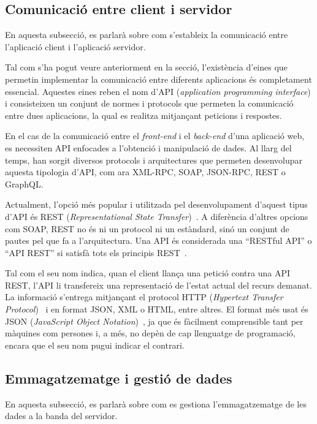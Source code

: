 \documentclass[a4paper,12pt]{ThesisStyle}
\begin{document}
\subsection{Comunicació entre client i servidor}
\label{subsec:comunicacio_cs}

En aquesta subsecció, es parlarà sobre com s'estableix la comunicació entre l'aplicació client i l'aplicació servidor.

Tal com s'ha pogut veure anteriorment en la secció, l'existència d'eines que permetin implementar la comunicació entre diferents aplicacions és completament essencial. Aquestes eines reben el nom d'API (\textit{application programming interface}) i consisteixen un conjunt de normes i protocols que permeten la comunicació entre dues aplicacions, la qual es realitza mitjançant peticions i respostes.

En el cas de la comunicació entre el \textit{front-end} i el \textit{back-end} d'una aplicació web, es necessiten API enfocades a l'obtenció i manipulació de dades. Al llarg del temps, han sorgit diversos protocols i arquitectures que permeten desenvolupar aquesta tipologia d'API, com ara XML-RPC, SOAP, JSON-RPC, REST o GraphQL.

Actualment, l'opció més popular i utilitzada pel desenvolupament d'aquest tipus d'API és REST (\textit{Representational State Transfer})~\cite{REST}. A diferència d'altres opcions com SOAP, REST no és ni un protocol ni un estàndard, sinó un conjunt de pautes pel que fa a l'arquitectura. Una API és considerada una ``RESTful API'' o ``API REST'' si satisfà tots els principis REST~\cite{REST_CONSTRAINTS}.

Tal com el seu nom indica, quan el client llança una petició contra una API REST, l'API li transfereix una representació de l'estat actual del recurs demanat. La informació s'entrega mitjançant el protocol HTTP (\textit{Hypertext Transfer Protocol})~\cite{HTTP} i en format JSON, XML o HTML, entre altres. El format més usat és JSON (\textit{JavaScript Object Notation})~\cite{JSON}, ja que és fàcilment comprensible tant per màquines com persones i, a més, no depèn de cap llenguatge de programació, encara que el seu nom pugui indicar el contrari.

\subsection{Emmagatzematge i gestió de dades}
\label{subsec:emmagatzematge_dades}

En aquesta subsecció, es parlarà sobre com es gestiona l'emmagatzematge de les dades a la banda del servidor.
\end{document}
